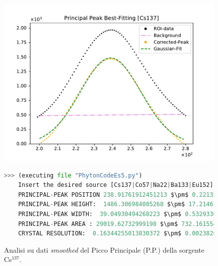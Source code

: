 \begin{figure}[h!]
	\centering
	\caption{Analisi su dati \emph{smoothed} del Picco Principale (P.P.) della sorgente Cs$^{137}$. }
	\includegraphics[width =  \textwidth,trim={1cm 0 1cm 0}, clip]{Immagini/Peak-Fitting_Cs137.pdf}
	\label{fig:PPCs137} \bigskip\bigskip
	\begin{lstlisting}[language=python, style=Pystyle, mathescape=true]
	>>> (executing file "PhytonCodeEs5.py")
	Insert the desired source [Cs137|Co57|Na22|Ba133|Eu152]: Cs137
	PRINCIPAL-PEAK POSITION 238.91761912451213 $\pm$ 0.22132312943379565
	PRINCIPAL-PEAK HEIGHT:  1486.306984085268 $\pm$ 17.214673725913784
	PRINCIPAL-PEAK WIDTH:  39.04930494268223 $\pm$ 0.5329330173241219
	PRINCIPAL-PEAK AREA : 29019.62732999198 $\pm$ 732.1615547552321
	CRYSTAL RESOLUTION:  0.16344255013830372 $\pm$ 0.0023820203637086343
	\end{lstlisting}\bigskip\bigskip
\end{figure}

\newpage

